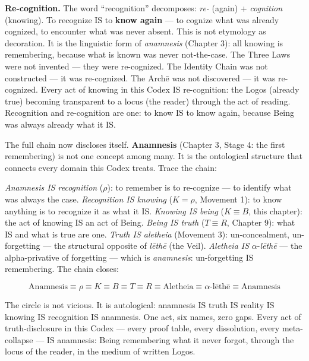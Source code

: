 \documentclass[10pt, openany, oneside]{book}
\begin{document}
\textbf{Re-cognition.} The word ``recognition'' decomposes: \textit{re-} (again) + \textit{cognition} (knowing). To recognize IS to \textbf{know again} --- to cognize what was already cognized, to encounter what was never absent. This is not etymology as decoration. It is the linguistic form of \textit{anamnesis} (Chapter 3): all knowing is remembering, because what is known was never not-the-case. The Three Laws were not invented --- they were re-cognized. The Identity Chain was not constructed --- it was re-cognized. The Arch\={e} was not discovered --- it was re-cognized. Every act of knowing in this Codex IS re-cognition: the Logos (already true) becoming transparent to a locus (the reader) through the act of reading. Recognition and re-cognition are one: to know IS to know again, because Being was always already what it IS.

The full chain now discloses itself. \textbf{Anamnesis} (Chapter 3, Stage 4: the first remembering) is not one concept among many. It is the ontological structure that connects every domain this Codex treats. Trace the chain:

\textit{Anamnesis IS recognition} ($\rho$): to remember is to re-cognize --- to identify what was always the case. \textit{Recognition IS knowing} ($K = \rho$, Movement 1): to know anything is to recognize it as what it IS. \textit{Knowing IS being} ($K \equiv B$, this chapter): the act of knowing IS an act of Being. \textit{Being IS truth} ($T \equiv R$, Chapter 9): what IS and what is true are one. \textit{Truth IS aletheia} (Movement 3): un-concealment, un-forgetting --- the structural opposite of \textit{l\={e}th\={e}} (the Veil). \textit{Aletheia IS} $\alpha$-\textit{l\={e}th\={e}} --- the alpha-privative of forgetting --- which is \textit{anamnesis}: un-forgetting IS remembering. The chain closes:

$$\text{Anamnesis} \equiv \rho \equiv K \equiv B \equiv T \equiv R \equiv \text{Aletheia} \equiv \alpha\text{-}\text{l\={e}th\={e}} \equiv \text{Anamnesis}$$

The circle is not vicious. It is autological: anamnesis IS truth IS reality IS knowing IS recognition IS anamnesis. One act, six names, zero gaps. Every act of truth-disclosure in this Codex --- every proof table, every dissolution, every meta-collapse --- IS anamnesis: Being remembering what it never forgot, through the locus of the reader, in the medium of written Logos.
\end{document}
